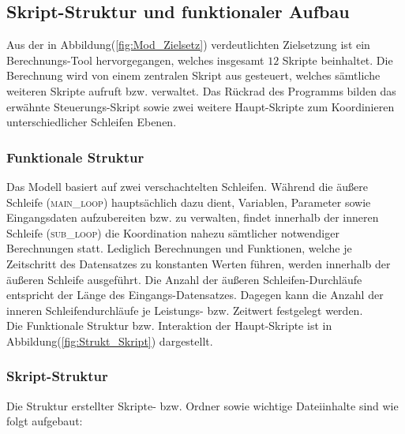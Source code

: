 \documentclass[onecolumn,10pt,titlepage]{article}
\begin{document}
\subsection{Skript-Struktur und funktionaler Aufbau}
\label{subs_Skript-Strukt}
Aus der in Abbildung(\ref{fig:Mod_Zielsetz}) verdeutlichten Zielsetzung ist ein Berechnungs-Tool hervorgegangen, welches insgesamt $12$ Skripte beinhaltet.
Die Berechnung wird von einem zentralen Skript aus gesteuert, welches sämtliche weiteren Skripte aufruft bzw. verwaltet. Das Rückrad des Programms bilden das erwähnte Steuerungs-Skript sowie zwei weitere Haupt-Skripte zum Koordinieren unterschiedlicher Schleifen Ebenen. 

\subsubsection{Funktionale Struktur}
\label{subs_Funkt-Strukt}
Das Modell basiert auf zwei verschachtelten Schleifen. Während die äußere Schleife (\textsc{main\_loop}) hauptsächlich dazu dient, Variablen, Parameter sowie Eingangsdaten aufzubereiten bzw. zu verwalten, findet innerhalb der inneren Schleife (\textsc{sub\_loop}) die Koordination nahezu sämtlicher notwendiger Berechnungen statt. Lediglich Berechnungen und Funktionen, welche je Zeitschritt des Datensatzes zu konstanten Werten führen, werden innerhalb der äußeren Schleife ausgeführt. Die Anzahl der äußeren Schleifen-Durchläufe entspricht der Länge des Eingangs-Datensatzes. Dagegen kann die Anzahl der inneren Schleifendurchläufe je Leistungs- bzw. Zeitwert festgelegt werden.\\

Die Funktionale Struktur bzw. Interaktion der Haupt-Skripte ist in Abbildung(\ref{fig:Strukt_Skript}) dargestellt. 
\newpage
\subsubsection{Skript-Struktur}
\label{subsubs_skrpt-strukt}
Die Struktur erstellter Skripte- bzw. Ordner sowie wichtige Dateiinhalte sind wie folgt aufgebaut:
\end{document}
